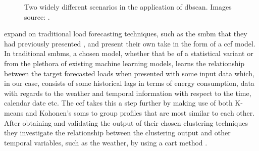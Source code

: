\begin{figure}[hbt!]
        \begin{adjustwidth*}{-0.5cm}{-0.5cm}%
                \myfloatalign
                 \quad
                 \quad
                \caption{Two widely different scenarios in the application of \gls{dbscan}. Images source: \cite{Kong} .}
        \end{adjustwidth*}
\end{figure}

\noindent \newline \citet{Yildiz} expand on traditional load forecasting techniques, such as the \gls{smbm} that they had previously presented \cite{Yildiz2}, and present their own take in the form of a \gls{ccf} model. In traditional \glspl{smbm}, a chosen model, whether that be of a statistical variant or from the plethora of existing machine learning models, learns the relationship between the target forecasted loads when presented with some input data which, in our case, consists of some historical lags in terms of energy consumption, data with regards to the weather and temporal information with respect to the time, calendar date etc. The \gls{ccf} takes this a step further by making use of both K-means and Kohonen's \glspl{som} \cite{Kohonen} to group profiles that are most similar to each other. After obtaining and validating the output of their chosen clustering techniques they investigate the relationship between the clustering output and other temporal variables, such as the weather, by using a \gls{cart} method \cite{James}.

